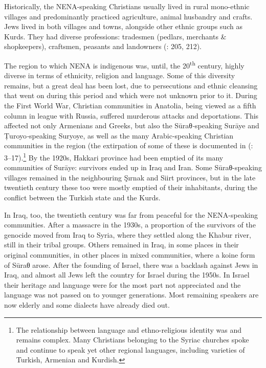 \documentclass[output=paper]{langsci/langscibook}
\begin{document}
Historically, the NENA-speaking Christians usually lived in rural mono-ethnic villages and predominantly practiced agriculture, animal husbandry and crafts. Jews lived in both villages and towns, alongside other ethnic groups such as Kurds. They had diverse professions: tradesmen (pedlars, merchants \& shopkeepers), craftsmen, peasants and landowners (\citealt{BrauerPatai1993}: 205, 212).

The region to which NENA is indigenous was, until, the 20\textsuperscript{th} century, highly diverse in terms of ethnicity, religion and language. Some of this diversity remains, but a great deal has been lost, due to persecutions and ethnic cleansing that went on during this period and which were not unknown prior to it. During the First World War, Christian communities in Anatolia, being viewed as a fifth column in league with Russia, suffered murderous attacks and deportations. This affected not only Armenians and Greeks, but also the Sūraθ\textit{{}-}speaking Surāye and Ṭuroyo\textit{{}-}speaking Suryoye, as well as the many Arabic-speaking Christian communities in the region (the extirpation of some of these is documented in (\citealt{Jastrow1978}: 3–17).\footnote{The relationship between language and ethno-religious identity was and remains complex. Many Christians belonging to the Syriac churches spoke and continue to speak yet other regional languages, including varieties of Turkish, Armenian and Kurdish.} By the 1920s, Hakkari province had been emptied of its many communities of Surāye: survivors ended up in Iraq and Iran. Some Sūraθ-speaking villages remained in the neighbouring Şırnak and Siirt provinces, but in the late twentieth century these too were mostly emptied of their inhabitants, during the conflict between the Turkish state and the Kurds.

In Iraq, too, the twentieth century was far from peaceful for the NENA-speaking communities. After a massacre in the 1930s, a proportion of the survivors of the genocide moved from Iraq to Syria, where they settled along the Khabur river, still in their tribal groups. Others remained in Iraq, in some places in their original communities, in other places in mixed communities, where a koine form of Sūraθ arose. After the founding of Israel, there was a backlash against Jews in Iraq, and almost all Jews left the country for Israel during the 1950s. In Israel their heritage and language were for the most part not appreciated and the language was not passed on to younger generations. Most remaining speakers are now elderly and some dialects have already died out.
\end{document}
